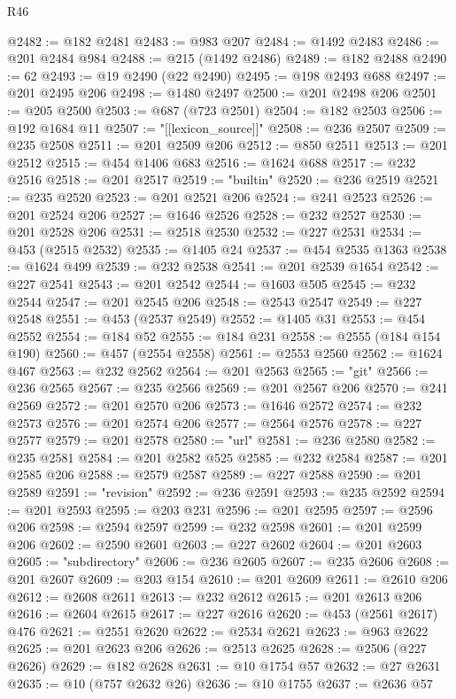 \begin{lexlean}{R46}
\begin{coremodule}
@2482 := @182 @2481
@2483 := @983 @207
@2484 := @1492 @2483
@2486 := @201 @2484 @984
@2488 := @215 (@1492 @2486)
@2489 := @182 @2488
@2490 := 62
@2493 := @19 @2490 (@22 @2490)
@2495 := @198 @2493 @688
@2497 := @201 @2495 @206
@2498 := @1480 @2497
@2500 := @201 @2498 @206
@2501 := @205 @2500
@2503 := @687 (@723 @2501)
@2504 := @182 @2503
@2506 := @192 @1684 @11
@2507 := "[[lexicon_source]]"
@2508 := @236 @2507
@2509 := @235 @2508
@2511 := @201 @2509 @206
@2512 := @850 @2511
@2513 := @201 @2512
@2515 := @454 @1406 @683
@2516 := @1624 @688
@2517 := @232 @2516
@2518 := @201 @2517
@2519 := "builtin"
@2520 := @236 @2519
@2521 := @235 @2520
@2523 := @201 @2521 @206
@2524 := @241 @2523
@2526 := @201 @2524 @206
@2527 := @1646 @2526
@2528 := @232 @2527
@2530 := @201 @2528 @206
@2531 := @2518 @2530
@2532 := @227 @2531
@2534 := @453 (@2515 @2532)
@2535 := @1405 @24
@2537 := @454 @2535 @1363
@2538 := @1624 @499
@2539 := @232 @2538
@2541 := @201 @2539 @1654
@2542 := @227 @2541
@2543 := @201 @2542
@2544 := @1603 @505
@2545 := @232 @2544
@2547 := @201 @2545 @206
@2548 := @2543 @2547
@2549 := @227 @2548
@2551 := @453 (@2537 @2549)
@2552 := @1405 @31
@2553 := @454 @2552
@2554 := @184 @52
@2555 := @184 @231
@2558 := @2555 (@184 @154 @190)
@2560 := @457 (@2554 @2558)
@2561 := @2553 @2560
@2562 := @1624 @467
@2563 := @232 @2562
@2564 := @201 @2563
@2565 := "git"
@2566 := @236 @2565
@2567 := @235 @2566
@2569 := @201 @2567 @206
@2570 := @241 @2569
@2572 := @201 @2570 @206
@2573 := @1646 @2572
@2574 := @232 @2573
@2576 := @201 @2574 @206
@2577 := @2564 @2576
@2578 := @227 @2577
@2579 := @201 @2578
@2580 := "url"
@2581 := @236 @2580
@2582 := @235 @2581
@2584 := @201 @2582 @525
@2585 := @232 @2584
@2587 := @201 @2585 @206
@2588 := @2579 @2587
@2589 := @227 @2588
@2590 := @201 @2589
@2591 := "revision"
@2592 := @236 @2591
@2593 := @235 @2592
@2594 := @201 @2593
@2595 := @203 @231
@2596 := @201 @2595
@2597 := @2596 @206
@2598 := @2594 @2597
@2599 := @232 @2598
@2601 := @201 @2599 @206
@2602 := @2590 @2601
@2603 := @227 @2602
@2604 := @201 @2603
@2605 := "subdirectory"
@2606 := @236 @2605
@2607 := @235 @2606
@2608 := @201 @2607
@2609 := @203 @154
@2610 := @201 @2609
@2611 := @2610 @206
@2612 := @2608 @2611
@2613 := @232 @2612
@2615 := @201 @2613 @206
@2616 := @2604 @2615
@2617 := @227 @2616
@2620 := @453 (@2561 @2617) @476
@2621 := @2551 @2620
@2622 := @2534 @2621
@2623 := @963 @2622
@2625 := @201 @2623 @206
@2626 := @2513 @2625
@2628 := @2506 (@227 @2626)
@2629 := @182 @2628
@2631 := @10 @1754 @57
@2632 := @27 @2631
@2635 := @10 (@757 @2632 @26)
@2636 := @10 @1755
@2637 := @2636 @57

\end{coremodule}
\end{lexlean}

